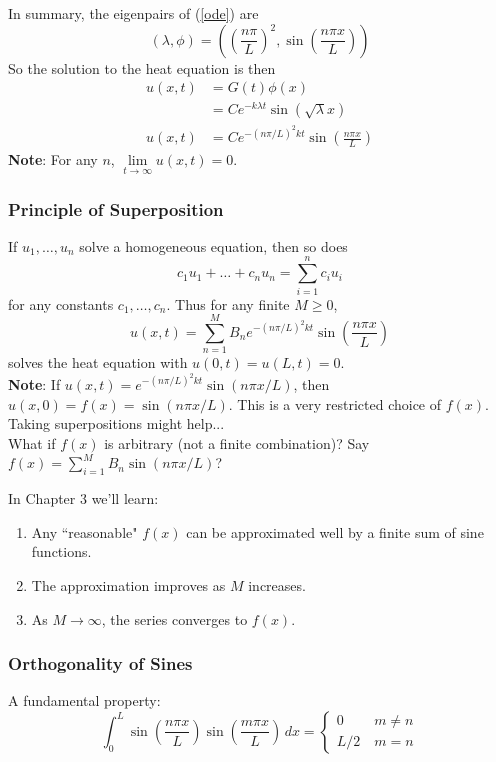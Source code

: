 \documentclass{article}
\begin{document}
	In summary, the eigenpairs of (\ref{ode}) are 
	\[
		(\lambda, \phi) = \left( \left( \frac{n\pi}{L}\right)^2, \sin\left( \frac{n\pi x}{L} \right) \right)
	\]
	So the solution to the heat equation is then
	\begin{align*}
		u(x,t) &= G(t) \phi(x) \\
		&= Ce^{-k\lambda t} \sin(\sqrt{\lambda} x) \\
		 u(x,t)&= Ce^{-(n\pi /L)^2 kt} \sin\left( \frac{n\pi x}{L} \right) 
	\end{align*}
	\textbf{Note}: For any $ n $, $ \lim\limits_{t\to\infty} u(x,t) = 0 $.
	
	\subsubsection*{Principle of Superposition}
	
	If $ u_1, \dots, u_n $ solve a homogeneous equation, then so does
	\[
		c_1 u_1 + \dots + c_n u_n = \sum\limits_{i=1}^{n} c_i u_i
	\]
	for any constants $ c_1, \dots, c_n $. Thus for any finite $ M \geq 0 $,
	\[
		u(x,t) = \sum\limits_{n=1}^{M} B_n e^{-(n\pi /L)^2 kt} \sin\left( \frac{n\pi x}{L} \right)
	\]
	solves the heat equation with $ u(0,t) = u(L,t) = 0 $. \\
	
	\textbf{Note}: If $ u(x,t) = e^{-(n\pi /L)^2 kt} \sin(n\pi x/ L) $, then $ u(x,0) = f(x) = \sin(n\pi x/L) $. This is a very restricted choice of $ f(x) $. Taking superpositions might help... \\
	
	What if $ f(x) $ is arbitrary (not a finite combination)? Say $ f(x) = \sum\limits_{i=1}^{M} B_n \sin(n\pi x/L) $?
	
	In Chapter 3 we'll learn:
	\begin{enumerate}[label=\arabic*.)]
		\item Any ``reasonable" $ f(x) $ can be approximated well by a finite sum of sine functions.
		\item The approximation improves as $ M $ increases.
		\item As $ M \to \infty $, the series converges to $ f(x) $.
	\end{enumerate}
	
	\subsubsection{Orthogonality of Sines}
	
	A fundamental property:
	\[
		\int_0^L \sin\left( \frac{n\pi x}{L} \right) \sin\left( \frac{m\pi x}{L} \right) \, dx = 
			\begin{cases}
				0 \qquad \, m \neq n \\
				L/2 \quad m = n
			\end{cases}
	\]
	
\end{document}
